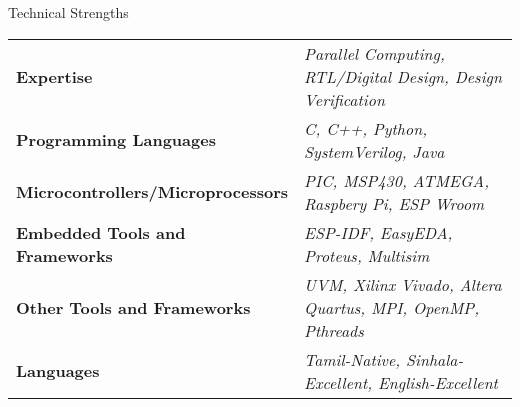 \documentclass[
	11pt, %
]{./assets/resume} %
\begin{document}
	




\begin{rSection}{Technical Strengths}

	\def\arraystretch{1.5}

	\begin{tabular}{ l l}
		\textbf{Expertise} & \emph{Parallel Computing, RTL/Digital Design, Design Verification} \\
		\textbf{Programming Languages} & \emph{C, C++, Python, SystemVerilog, Java} \\
		\textbf{Microcontrollers/Microprocessors} & \emph{PIC, MSP430, ATMEGA, Raspbery Pi, ESP Wroom} \\
		\textbf{Embedded Tools and Frameworks} & \emph{ESP-IDF, EasyEDA, Proteus, Multisim} \\ 
		\textbf{Other Tools and Frameworks} & \emph{UVM, Xilinx Vivado, Altera Quartus, MPI, OpenMP, Pthreads} \\ 
		\textbf{Languages} & \emph{Tamil-Native, Sinhala-Excellent, English-Excellent} \\
	\end{tabular}

\end{rSection}
\end{document}
